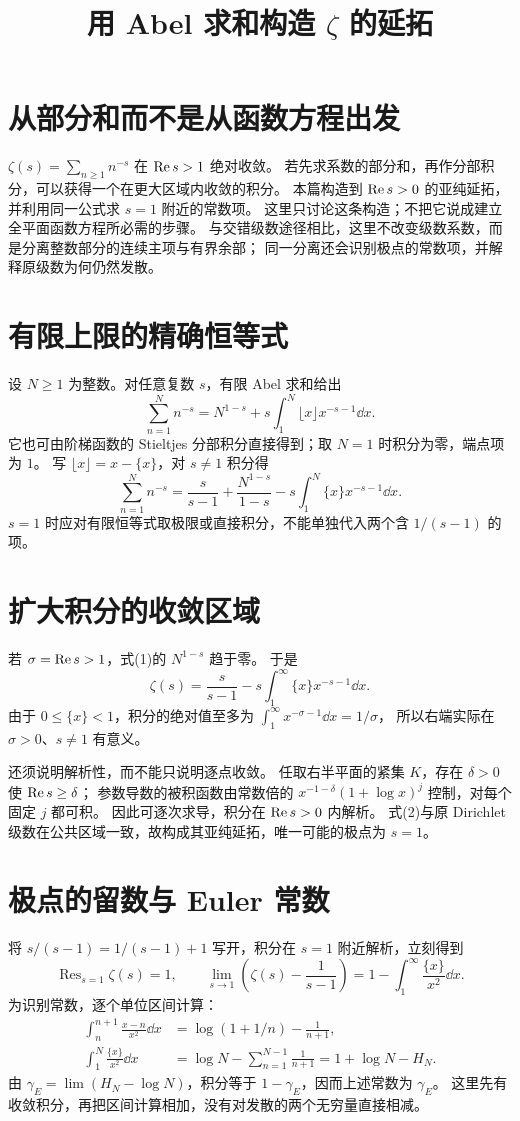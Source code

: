 \documentclass[UTF8,fontset=fandol,11pt]{ctexart}
\title{用 Abel 求和构造 $\zeta$ 的延拓}
\begin{document}
\maketitle
\draftnotice
\section{从部分和而不是从函数方程出发}
$\zeta(s)=\sum_{n\ge1}n^{-s}$ 在 $\operatorname{Re} s>1$ 绝对收敛。
若先求系数的部分和，再作分部积分，可以获得一个在更大区域内收敛的积分。
本篇构造到 $\operatorname{Re} s>0$ 的亚纯延拓，并利用同一公式求 $s=1$ 附近的常数项。
这里只讨论这条构造；不把它说成建立全平面函数方程所必需的步骤。
与交错级数途径相比，这里不改变级数系数，而是分离整数部分的连续主项与有界余部；
同一分离还会识别极点的常数项，并解释原级数为何仍然发散。

\section{有限上限的精确恒等式}
设 $N\ge1$ 为整数。对任意复数 $s$，有限 Abel 求和给出
\[
 \sum_{n=1}^Nn^{-s}
 =N^{1-s}+s\int_1^N\lfloor x\rfloor x^{-s-1}\dd x.
\]
它也可由阶梯函数的 Stieltjes 分部积分直接得到；取 $N=1$ 时积分为零，端点项为 $1$。
写 $\lfloor x\rfloor=x-\{x\}$，对 $s\ne1$ 积分得
\[
 \sum_{n=1}^Nn^{-s}
 =\frac{s}{s-1}+\frac{N^{1-s}}{1-s}
  -s\int_1^N\{x\}x^{-s-1}\dd x.                 \tag{1}
\]
$s=1$ 时应对有限恒等式取极限或直接积分，不能单独代入两个含 $1/(s-1)$ 的项。

\section{扩大积分的收敛区域}
若 $\sigma=\operatorname{Re} s>1$，式(1)的 $N^{1-s}$ 趋于零。
于是
\[
 \zeta(s)=\frac{s}{s-1}
 -s\int_1^\infty\{x\}x^{-s-1}\dd x.             \tag{2}
\]
由于 $0\le\{x\}<1$，积分的绝对值至多为
$\int_1^\infty x^{-\sigma-1}\dd x=1/\sigma$，
所以右端实际在 $\sigma>0$、$s\ne1$ 有意义。

还须说明解析性，而不能只说明逐点收敛。
任取右半平面的紧集 $K$，存在 $\delta>0$ 使 $\operatorname{Re} s\ge\delta$；
参数导数的被积函数由常数倍的
$x^{-1-\delta}(1+\log x)^j$ 控制，对每个固定 $j$ 都可积。
因此可逐次求导，积分在 $\operatorname{Re} s>0$ 内解析。
式(2)与原 Dirichlet 级数在公共区域一致，故构成其亚纯延拓，唯一可能的极点为 $s=1$。

\section{极点的留数与 Euler 常数}
将 $s/(s-1)=1/(s-1)+1$ 写开，积分在 $s=1$ 附近解析，立刻得到
\[
 \operatorname{Res}_{s=1}\zeta(s)=1,\qquad
 \lim_{s\to1}\left(\zeta(s)-\frac1{s-1}\right)
 =1-\int_1^\infty\frac{\{x\}}{x^2}\dd x.
\]
为识别常数，逐个单位区间计算：
\begin{align*}
 \int_n^{n+1}\frac{x-n}{x^2}\dd x
 &=\log(1+1/n)-\frac1{n+1},\\
 \int_1^N\frac{\{x\}}{x^2}\dd x
 &=\log N-\sum_{n=1}^{N-1}\frac1{n+1}
 =1+\log N-H_N.
\end{align*}
由 $\gamma_E=\lim(H_N-\log N)$，积分等于 $1-\gamma_E$，因而上述常数为 $\gamma_E$。
这里先有收敛积分，再把区间计算相加，没有对发散的两个无穷量直接相减。
\end{document}
